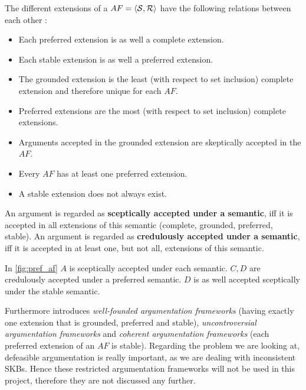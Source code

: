 \begin{remark}
The different extensions of a $AF = \langle \mathcal{S}, \mathcal{R} \rangle$ have the following relations between each other \cite{dung1995}:
\begin{itemize} 
	\item Each preferred extension is as well a complete extension.
	\item Each stable extension is as well a preferred extension.
	\item The grounded extension is the least (with respect to set inclusion) complete extension and therefore unique for each $AF$.
	\item Preferred extensions are the most (with respect to set inclusion) complete extensions.
	\item Arguments accepted in the grounded extension are skeptically accepted in the $AF$.
	\item Every $AF$ has at least one preferred extension.
	\item A stable extension does not always exist.
\end{itemize}
\end{remark}


\begin{definition}	
	An argument is regarded as \textbf{sceptically accepted under a semantic}, iff it is accepted in all extensions of this semantic (complete, grounded, preferred, stable). An argument is regarded as \textbf{credulously accepted under a semantic}, iff it is accepted in at least one, but not all, extensions of this semantic. 	
\end{definition}

\begin{exa}
	In \autoref{fig:pref_af} $A$ is sceptically accepted under each semantic. $C, D$ are credulously accepted under a preferred semantic. $D$ is as well accepted sceptically under the stable semantic.
\end{exa}


Furthermore \cite{dung1995} introduces \textit{well-founded argumentation frameworks} (having exactly one extension that is grounded, preferred and stable), \textit{uncontroversial argumentation frameworks} and \textit{coherent argumentation frameworks} (each preferred extension of an $AF$ is stable). Regarding the problem we are looking at, defeasible argumentation is really important, as we are dealing with inconsistent \glspl{SKB}. Hence these restricted argumentation frameworks will not be used in this project, therefore they are not discussed any further.


